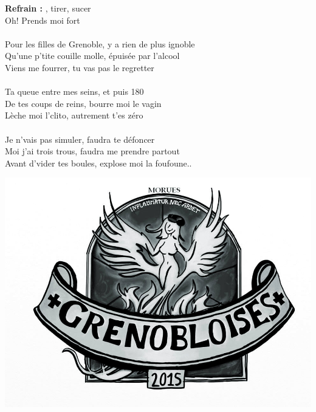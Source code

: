 
\textbf{Refrain :}
, tirer, sucer
\\Oh! Prends moi fort
\\\\Pour les filles de Grenoble, y a rien de plus ignoble
\\Qu'une p'tite couille molle, épuisée par l'alcool
\\Viens me fourrer, tu vas pas le regretter
\\\\Ta queue entre mes seins, et puis 180
\\De tes coups de reins, bourre moi le vagin
\\Lèche moi l'clito, autrement t'es zéro
\\\\Je n'vais pas simuler, faudra te défoncer
\\Moi j'ai trois trous, faudra me prendre partout
\\Avant d'vider tes boules, explose moi la foufoune..
\\
\bigskip
\begin{center}
\includegraphics[width=1\textwidth]{images/morue.jpg}
\end{center}

\breakpage